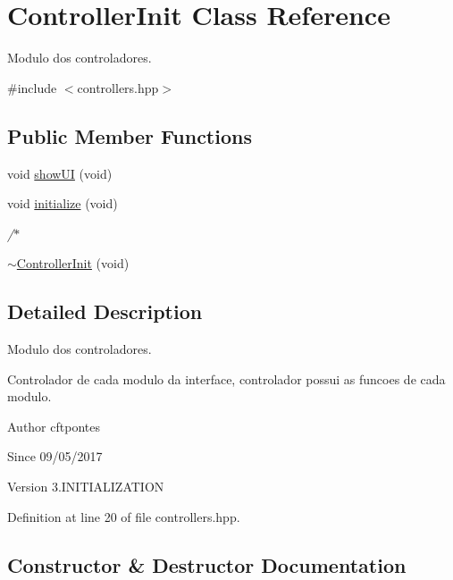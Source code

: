 \hypertarget{class_controller_init}{}\section{Controller\+Init Class Reference}
\label{class_controller_init}


Modulo dos controladores.  




{\ttfamily \#include $<$controllers.\+hpp$>$}

\subsection*{Public Member Functions}
\begin{DoxyCompactItemize}
\item 
void \hyperlink{class_controller_init_a7a496045ee93029b095e84ce55e1818f}{show\+UI} (void)
\item 
void \hyperlink{class_controller_init_afd943d8b12a0d2ed5b2df171aaedb378}{initialize} (void)
\begin{DoxyCompactList}\small\item\em /$\ast$ \end{DoxyCompactList}\item 
\hyperlink{class_controller_init_a285ab516808ff22b04a4bc6afbb57635}{$\sim$\+Controller\+Init} (void)
\end{DoxyCompactItemize}


\subsection{Detailed Description}
Modulo dos controladores. 

Controlador de cada modulo da interface, controlador possui as funcoes de cada modulo. \begin{DoxyAuthor}{Author}
cftpontes 
\end{DoxyAuthor}
\begin{DoxySince}{Since}
09/05/2017 
\end{DoxySince}
\begin{DoxyVersion}{Version}
3.\+I\+N\+I\+T\+I\+A\+L\+I\+Z\+A\+T\+I\+ON 
\end{DoxyVersion}


Definition at line 20 of file controllers.\+hpp.



\subsection{Constructor \& Destructor Documentation}
\mbox{\label{class_controller_init_a285ab516808ff22b04a4bc6afbb57635}} 
